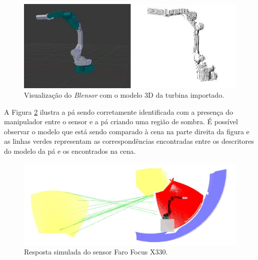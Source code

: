 \begin{figure}[H]
	\centering
	\includegraphics[width=0.9\columnwidth]{figs/calibracao/mh12_model}
	\caption{Visualização do \textit{Blensor} com o modelo 3D da turbina
	importado.}
    \label{fig::model_mh12}
\end{figure}

A Figura \ref{fig::sim_mh12}
ilustra a pá sendo corretamente identificada com a presença do manipulador entre
o sensor e a pá criando uma região de sombra. É possível observar o modelo que
está sendo comparado à cena na parte direita da figura e as linhas verdes
representam as correspondências encontradas entre os descritores do modelo da pá
e os encontrados na cena.

\begin{figure}[H]
	\centering
	\includegraphics[width=0.9\columnwidth]{figs/calibracao/sim_mh12_sp}
	\caption{Resposta simulada do sensor Faro Focus X330.}
    \label{fig::sim_mh12}
\end{figure}	
